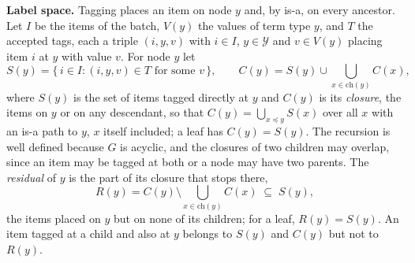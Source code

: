 \textbf{Label space.} Tagging places an item on node $y$ and, by is-a, on every
ancestor. Let $I$ be the items of the batch, $V(y)$ the values of term type
$y$, and $T$ the accepted tags, each a triple $(i, y, v)$ with $i \in I$,
$y \in \mathcal{Y}$ and $v \in V(y)$ placing item $i$ at $y$ with value $v$.
For node $y$ let
\begin{equation}
  \label{eq:closure}
  S(y) = \{\, i \in I : (i, y, v) \in T \text{ for some } v \,\}, \qquad
  C(y) = S(y) \cup \bigcup_{x \in \mathrm{ch}(y)} C(x),
\end{equation}
where $S(y)$ is the set of items tagged directly at $y$ and $C(y)$ is its
\emph{closure}, the items on $y$ or on any descendant, so that
$C(y) = \bigcup_{x \preceq y} S(x)$ over all $x$ with an is-a path to $y$,
$x$ itself included; a leaf has $C(y) = S(y)$. The recursion is well defined
because $G$ is acyclic, and the closures of two children may overlap, since an
item may be tagged at both or a node may have two parents. The
\emph{residual} of $y$ is the part of its closure that stops there,
\begin{equation}
  \label{eq:residual}
  R(y) = C(y) \setminus \bigcup_{x \in \mathrm{ch}(y)} C(x) \;\subseteq\; S(y),
\end{equation}
the items placed on $y$ but on none of its children; for a leaf,
$R(y) = S(y)$. An item tagged at a child and also at $y$ belongs to $S(y)$
and $C(y)$ but not to $R(y)$.

